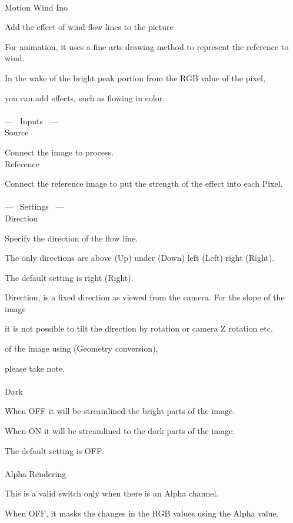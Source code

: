 \documentclass[a4paper,12pt]{article}
\begin{document}
\thispagestyle{empty}

\Large
\noindent \\
Motion Wind Ino\medskip
\par
\normalsize
Add the effect of wind flow lines to the picture\\
\par
For animation, it uses a fine arts drawing method to represent the reference to wind.\par
In the wake of the bright peak portion from the RGB value of the pixel,\par
you can add effects, such as flowing in color.\\
\\
--- \ Inputs \ ---\\
Source\par
Connect the image to process.\\
Reference\par
Connect the reference image to put the strength of the effect into each Pixel.\\
\\
--- \ Settings \ ---\\
Direction\par
Specify the direction of the flow line.\par
The only directions are above (Up) under (Down) left (Left) right (Right).\par
The default setting is right (Right).\par
Direction, is a fixed direction as viewed from the camera. For the slope of the image\par
it is not possible to tilt the direction by rotation or camera Z rotation etc.\par
of the image using (Geometry conversion),\par
please take note.\\
\\
Dark\par
When OFF it will be streamlined the bright parts of the image.\par
When ON it will be streamlined to the dark parts of the image.\par
The default setting is OFF.\\
\\
Alpha Rendering\par
This is a valid switch only when there is an Alpha channel.\par
When OFF, it masks the changes in the RGB values using the Alpha value.\par
\end{document}
